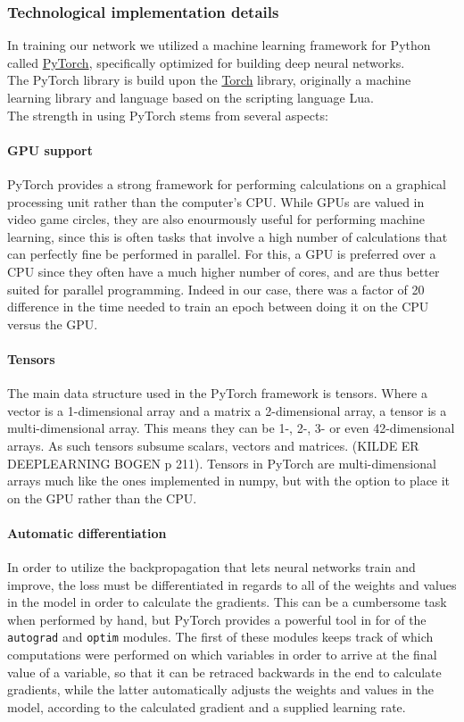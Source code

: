 \begin{multicols}{2}
\subsubsection{Technological implementation details}
In training our network we utilized a machine learning framework for Python called \href{https://pytorch.org/}{PyTorch}, specifically optimized for building deep neural networks. \\
The PyTorch library is build upon the \href{http://torch.ch/}{Torch} library, originally a machine learning library and language based on the scripting language Lua.\\
The strength in using PyTorch stems from several aspects:
\paragraph{GPU support}
PyTorch provides a strong framework for performing calculations on a graphical processing unit rather than the computer's CPU. While GPUs are valued in video game circles, they are also enourmously useful for performing machine learning, since this is often tasks that involve a high number of calculations that can perfectly fine be performed in parallel. For this, a GPU is preferred over a CPU since they often have a much higher number of cores, and are thus better suited for parallel programming. Indeed in our case, there was a factor of 20 difference in the time needed to train an epoch between doing it on the CPU versus the GPU.
\paragraph{Tensors}
The main data structure used in the PyTorch framework is tensors. Where a vector is a 1-dimensional array and a matrix a 2-dimensional array, a tensor is a multi-dimensional array. This means they can be 1-, 2-, 3- or even 42-dimensional arrays. As such tensors subsume scalars, vectors and matrices. (KILDE ER DEEPLEARNING BOGEN p 211). Tensors in PyTorch are multi-dimensional arrays much like the ones implemented in numpy, but with the option to place it on the GPU rather than the CPU.

\paragraph{Automatic differentiation}
In order to utilize the backpropagation that lets neural networks train and improve, the loss must be differentiated in regards to all of the weights and values in the model in order to calculate the gradients. This can be a cumbersome task when performed by hand, but PyTorch provides a powerful tool in for of the \texttt{autograd} and \texttt{optim} modules. The first of these modules keeps track of which computations were performed on which variables in order to arrive at the final value of a variable, so that it can be retraced backwards in the end to calculate gradients, while the latter automatically adjusts the weights and values in the model, according to the calculated gradient and a supplied learning rate.


\end{multicols}
